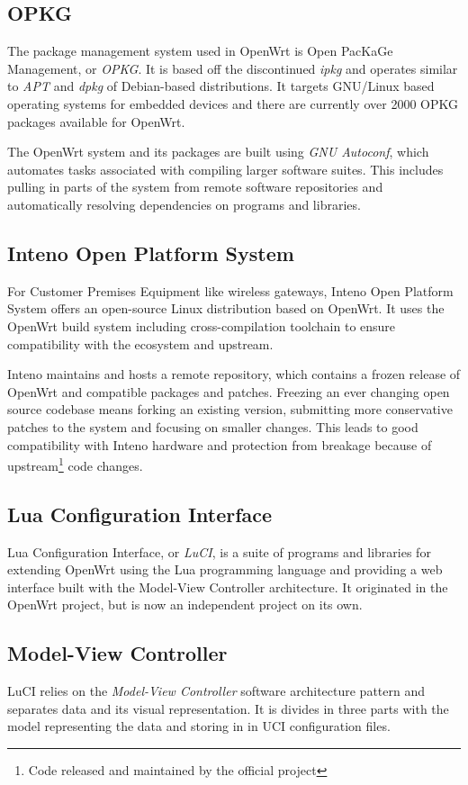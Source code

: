 \documentclass[g5paper,11pt]{kth-bcs}
\begin{document}
\subsection{OPKG}
The package management system used in OpenWrt is Open PacKaGe Management, or \emph{OPKG}. It is based off the discontinued \emph{ipkg} and operates similar to \emph{APT} and \emph{dpkg} of Debian-based distributions.
It targets GNU/Linux based operating systems for embedded devices and there are currently over 2000 OPKG packages available for OpenWrt.

The OpenWrt system and its packages are built using \emph{GNU Autoconf}, which automates tasks associated with compiling larger software suites.
This includes pulling in parts of the system from remote software repositories and automatically resolving dependencies on programs and libraries.

\subsection{Inteno Open Platform System}
For Customer Premises Equipment like wireless gateways, Inteno Open Platform System offers an open-source Linux distribution based on OpenWrt.
It uses the OpenWrt build system including cross-compilation toolchain to ensure compatibility with the ecosystem and upstream.

Inteno maintains and hosts a remote repository, which contains a frozen release of OpenWrt and compatible packages and patches.
Freezing an ever changing open source codebase means forking an existing version, submitting more conservative patches to the system and focusing on smaller changes.
This leads to good compatibility with Inteno hardware and protection from breakage because of upstream\footnote{Code released and maintained by the official project} code changes.

\subsection{Lua Configuration Interface}\label{sec:LuCI}
Lua Configuration Interface, or \emph{LuCI}, is a suite of programs and libraries for extending OpenWrt using the Lua programming language and providing a web interface built with the Model-View Controller architecture.
It originated in the OpenWrt project, but is now an independent project on its own.


\subsection{Model-View Controller}
LuCI relies on the \emph{Model-View Controller} software architecture pattern and separates data and its visual representation.
It is divides in three parts with the model representing the data and storing in in UCI configuration files.
\end{document}
